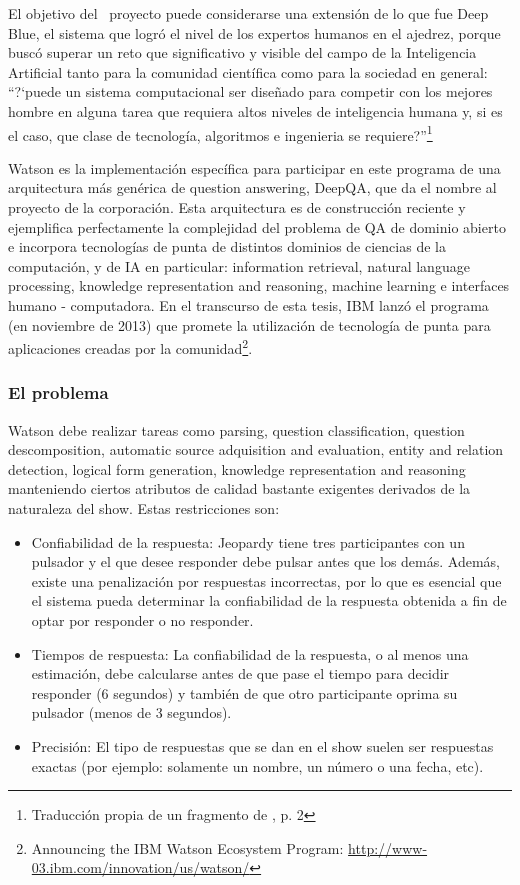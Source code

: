 El objetivo del \ proyecto puede considerarse una extensión de lo que
fue Deep Blue, el sistema que logró el nivel de los expertos humanos
en el ajedrez, porque buscó superar un reto que significativo y
visible del campo de la Inteligencia Artificial tanto para la comunidad
científica como para la sociedad en general:
{\textquotedblleft}?`puede un sistema computacional ser diseñado para
competir con los mejores hombre en alguna tarea que requiera altos
niveles de inteligencia humana y, si es el caso, que clase de
tecnología, algoritmos e ingenieria se
requiere?{\textquotedblright}\footnote{Traducción propia de
un fragmento de \cite{WATSON1}, p. 2}

Watson es la implementación específica para participar en este
programa de una arquitectura más genérica de question answering,
DeepQA, que da el nombre al proyecto de la corporación. Esta
arquitectura es de construcción reciente y ejemplifica perfectamente la complejidad del problema de
QA de dominio abierto e incorpora tecnologías de punta de distintos
dominios de ciencias de la computación, y de IA en particular:
information retrieval, natural language processing, knowledge
representation and reasoning, machine learning e interfaces humano -
computadora. En el transcurso de esta tesis, IBM lanzó el programa
 (en noviembre de 2013) que promete la utilización
de tecnología de punta para aplicaciones creadas por la comunidad\footnote{
Announcing the IBM Watson Ecosystem Program: \url{http://www-03.ibm.com/innovation/us/watson/}}.

\subsubsection*{El problema}

Watson debe realizar tareas como parsing, question classification,
question descomposition, automatic source adquisition and evaluation,
entity and relation detection, logical form generation, knowledge
representation and reasoning manteniendo ciertos atributos de calidad
bastante exigentes derivados de la naturaleza del show. Estas
restricciones son:

\begin{itemize}
\item Confiabilidad de la respuesta: \newline
Jeopardy tiene tres participantes con un pulsador y el que desee
responder debe pulsar antes que los demás. Además, existe una
penalización por respuestas incorrectas, por lo que es esencial que
el sistema pueda determinar la confiabilidad de la respuesta obtenida a
fin de optar por responder o no responder.
\item Tiempos de respuesta: \newline
La confiabilidad de la respuesta, o al menos una estimación, debe
calcularse antes de que pase el tiempo para decidir responder (6
segundos) y también de que otro participante oprima su pulsador
(menos de 3 segundos).
\item Precisión:\newline
El tipo de respuestas que se dan en el show suelen ser respuestas
exactas (por ejemplo: solamente un nombre, un número o una fecha,
etc). 
\end{itemize}

